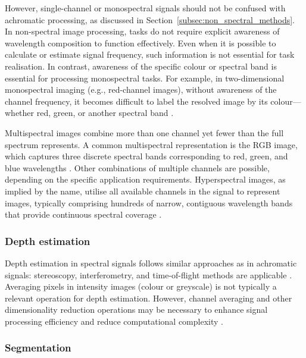 \documentclass[12pt,a4paper,oneside]{report}
\begin{document}
However, single-channel or monospectral signals should not be confused with achromatic processing, as discussed in Section~\ref{subsec:non_spectral_methods}. In non-spectral image processing, tasks do not require explicit awareness of wavelength composition to function effectively. Even when it is possible to calculate or estimate signal frequency, such information is not essential for task realisation. In contrast, awareness of the specific colour or spectral band is essential for processing monospectral tasks. For example, in two-dimensional monospectral imaging (e.g., red-channel images), without awareness of the channel frequency, it becomes difficult to label the resolved image by its colour—whether red, green, or another spectral band \cite{elachi2021}.

Multispectral images combine more than one channel yet fewer than the full spectrum represents. A common multispectral representation is the RGB image, which captures three discrete spectral bands corresponding to red, green, and blue wavelengths \cite{schott2007}. Other combinations of multiple channels are possible, depending on the specific application requirements. Hyperspectral images, as implied by the name, utilise all available channels in the signal to represent images, typically comprising hundreds of narrow, contiguous wavelength bands that provide continuous spectral coverage \cite{heinz2001,vasile2023}.

\subsubsection{Depth estimation}
\label{subsubsec:spectral_depth_estimation}

Depth estimation in spectral signals follows similar approaches as in achromatic signals: stereoscopy, interferometry, and time-of-flight methods are applicable \cite{laga2022}. Averaging pixels in intensity images (colour or greyscale) is not typically a relevant operation for depth estimation. However, channel averaging and other dimensionality reduction operations may be necessary to enhance signal processing efficiency and reduce computational complexity \cite{heinz2001}.

\subsubsection{Segmentation}
\label{subsubsec:spectral_segmentation}
\end{document}
